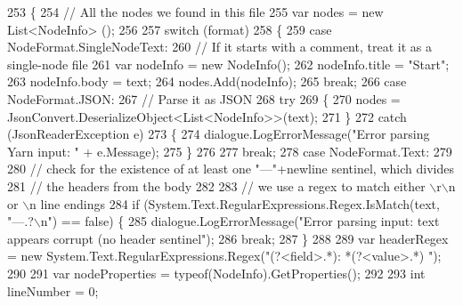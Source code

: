 \begin{DoxyCode}
253         \{
254             \textcolor{comment}{// All the nodes we found in this file}
255             var nodes = \textcolor{keyword}{new} List<NodeInfo> ();
256 
257             \textcolor{keywordflow}{switch} (format)
258             \{
259                 \textcolor{keywordflow}{case} NodeFormat.SingleNodeText:
260                     \textcolor{comment}{// If it starts with a comment, treat it as a single-node file}
261                     var nodeInfo = \textcolor{keyword}{new} NodeInfo();
262                     nodeInfo.title = \textcolor{stringliteral}{"Start"};
263                     nodeInfo.body = text;
264                     nodes.Add(nodeInfo);
265                     \textcolor{keywordflow}{break};
266                 \textcolor{keywordflow}{case} NodeFormat.JSON:
267                     \textcolor{comment}{// Parse it as JSON}
268                     \textcolor{keywordflow}{try}
269                     \{
270                         nodes = JsonConvert.DeserializeObject<List<NodeInfo>>(text);
271                     \}
272                     \textcolor{keywordflow}{catch} (JsonReaderException e)
273                     \{
274                         dialogue.LogErrorMessage(\textcolor{stringliteral}{"Error parsing Yarn input: "} + e.Message);
275                     \}
276 
277                     \textcolor{keywordflow}{break};
278                 \textcolor{keywordflow}{case} NodeFormat.Text:
279 
280                     \textcolor{comment}{// check for the existence of at least one "---"+newline sentinel, which divides}
281                     \textcolor{comment}{// the headers from the body}
282 
283                     \textcolor{comment}{// we use a regex to match either \(\backslash\)r\(\backslash\)n or \(\backslash\)n line endings}
284                     \textcolor{keywordflow}{if} (System.Text.RegularExpressions.Regex.IsMatch(text, \textcolor{stringliteral}{"---.?\(\backslash\)n"}) == \textcolor{keyword}{false}) \{
285                         dialogue.LogErrorMessage(\textcolor{stringliteral}{"Error parsing input: text appears corrupt (no header
       sentinel"});
286                         \textcolor{keywordflow}{break};
287                     \}
288 
289                     var headerRegex = \textcolor{keyword}{new} System.Text.RegularExpressions.Regex(\textcolor{stringliteral}{"(?<field>.*): *(?<value>.*)
      "});
290 
291                     var nodeProperties = typeof(NodeInfo).GetProperties();
292 
293                     \textcolor{keywordtype}{int} lineNumber = 0;

\end{DoxyCode}
